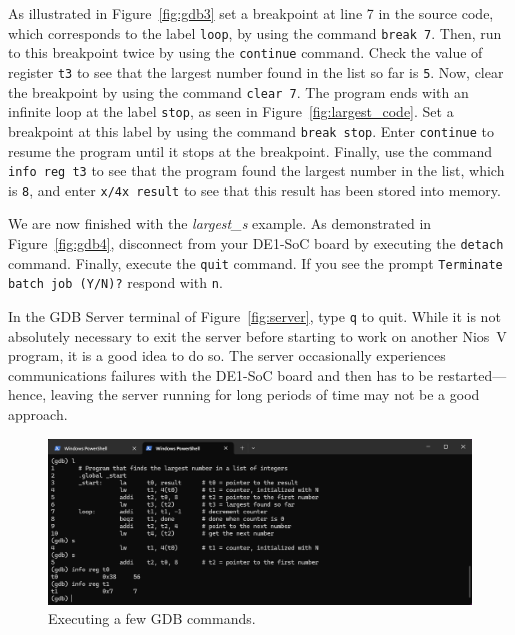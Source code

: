 \documentclass[11pt, twoside, pdftex]{article}
\begin{document}
As illustrated in Figure~\ref{fig:gdb3} set a breakpoint at line 7 in the source code,
which corresponds to the label \texttt{loop}, by using the command \texttt{break 7}.
Then, run to this breakpoint twice by using the \texttt{continue}
command. Check the value of register \texttt{t3} to see that the largest number found in
the list so far is \texttt{5}. 
Now, clear the breakpoint by using the command \texttt{clear 7}. The program ends with an 
infinite loop at the label \texttt{stop}, as seen in Figure~\ref{fig:largest_code}. Set a
breakpoint at this label by using the command \texttt{break stop}. Enter \texttt{continue} to 
resume the program until it stops at the breakpoint. 
Finally, use the command \texttt{info reg t3} to see that the program 
found the largest number in the list, which is \texttt{8}, and enter \texttt{x/4x result} 
to see that this result has been stored into memory.

We are now finished with the {\it largest\_s} example. As demonstrated in Figure~\ref{fig:gdb4},
disconnect from your DE1-SoC board by executing the \texttt{detach} command. Finally, execute
the \texttt{quit} command. If you see the prompt \texttt{Terminate batch job (Y/N)?}
respond with \texttt{n}.

In the GDB Server terminal of Figure~\ref{fig:server}, type \texttt{q} to quit. While
it is not absolutely necessary to exit the server before starting to work on another
Nios~V program, it is a good idea to do so. The server occasionally experiences
communications failures with the DE1-SoC board and then has to be restarted---hence, leaving 
the server running for long periods of time may not be a good approach.
        
\begin{figure}[h]
    \begin{center}
        \includegraphics[scale=.6]{figures/gdb2.png}
        \caption{Executing a few GDB commands.}
        \label{fig:gdb2}
    \end{center}
\end{figure}
\end{document}
